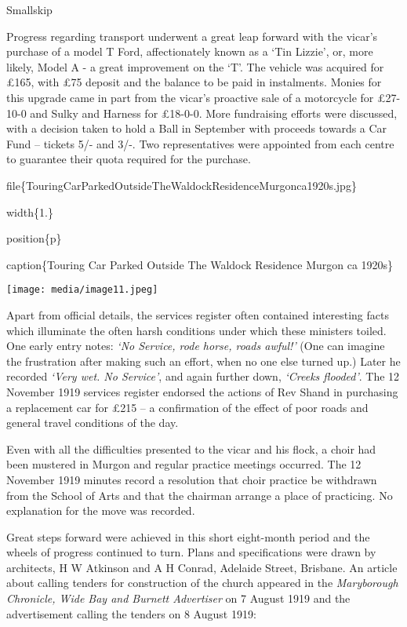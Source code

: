 Smallskip

Progress regarding transport underwent a great leap forward with the vicar's purchase of a model T Ford, affectionately known as a `Tin Lizzie', or, more likely, Model A - a great improvement on the `T'. The vehicle was acquired for £165, with £75 deposit and the balance to be paid in instalments. Monies for this upgrade came in part from the vicar's proactive sale of a motorcycle for £27-10-0 and Sulky and Harness for £18-0-0. More fundraising efforts were discussed, with a decision taken to hold a Ball in September with proceeds towards a Car Fund -- tickets 5/- and 3/-. Two representatives were appointed from each centre to guarantee their quota required for the purchase.

file\{TouringCarParkedOutsideTheWaldockResidenceMurgonca1920s.jpg\}

width\{1.\}

position\{p\}

caption\{Touring Car Parked Outside The Waldock Residence Murgon ca 1920s\}

\texttt{[image: media/image11.jpeg]}

Apart from official details, the services register often contained interesting facts which illuminate the often harsh conditions under which these ministers toiled. One early entry notes: \emph{`No Service, rode horse, roads awful!'} (One can imagine the frustration after making such an effort, when no one else turned up.) Later he recorded \emph{`Very wet. No Service'}, and again further down, \emph{`Creeks flooded'}. The 12 November 1919 services register endorsed the actions of Rev Shand in purchasing a replacement car for £215 -- a confirmation of the effect of poor roads and general travel conditions of the day.

Even with all the difficulties presented to the vicar and his flock, a choir had been mustered in Murgon and regular practice meetings occurred. The 12 November 1919 minutes record a resolution that choir practice be withdrawn from the School of Arts and that the chairman arrange a place of practicing. No explanation for the move was recorded.

Great steps forward were achieved in this short eight-month period and the wheels of progress continued to turn. Plans and specifications were drawn by architects, H W Atkinson and A H Conrad, Adelaide Street, Brisbane. An article about calling tenders for construction of the church appeared in the \emph{Maryborough Chronicle, Wide Bay and Burnett Advertiser} on 7 August 1919 and the advertisement calling the tenders on 8 August 1919:


